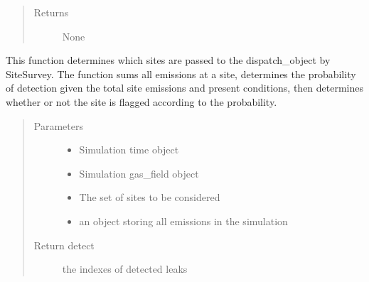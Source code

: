 \documentclass[letterpaper,10pt,english]{sphinxmanual}
\begin{document}
\begin{fulllineitems}
\begin{fulllineitems}
\begin{quote}
\begin{description}
\begin{itemize}
\end{itemize}

\item[{Returns}] \leavevmode
None

\end{description}\end{quote}

\end{fulllineitems}


\begin{fulllineitems}
\label{\detokenize{index:feast.DetectionModules.site_survey.SiteSurvey.detect_prob_curve}}
This function determines which sites are passed to the dispatch\_object by SiteSurvey.  The function sums all
emissions at a site, determines the probability of detection given the total site emissions and present
conditions, then determines whether or not the site is flagged according to the probability.
\begin{quote}\begin{description}
\item[{Parameters}] \leavevmode\begin{itemize}
\item {} 
 \textendash{} Simulation time object

\item {} 
 \textendash{} Simulation gas\_field object

\item {} 
 \textendash{} The set of sites to be considered

\item {} 
 \textendash{} an object storing all emissions in the simulation

\end{itemize}

\item[{Return detect}] \leavevmode
the indexes of detected leaks

\end{description}\end{quote}


\end{fulllineitems}
\end{fulllineitems}
\end{document}
